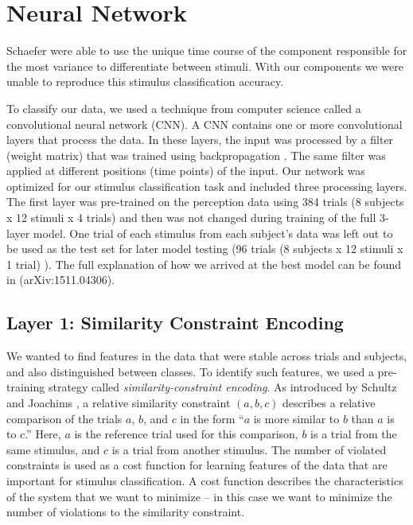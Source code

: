 \chapter{Neural Network}
Schaefer \etal \citeyear{schaefer_name_2011} were able to use the unique time course of the component responsible for the most variance to differentiate between stimuli.
With our components we were unable to reproduce this stimulus classification accuracy. 
 
To classify our data, we used a technique from computer science called a convolutional neural network (\ac{CNN}).
A \ac{CNN} contains one or more convolutional layers that process the data. 
In these layers, the input was processed by a filter (weight matrix) that was trained using backpropagation \cite{Rumelhart_backpropagation_1986}. 
The same filter was applied at different positions (time points) of the input. 
Our network was optimized for our stimulus classification task and included three processing layers.
The first layer was pre-trained on the perception data using 384 trials (8 subjects x 12 stimuli x 4 trials) and then was not changed during training of the full 3-layer model. 
One trial of each stimulus from each subject's data was left out to be used as the test set for later model testing (96 trials (8 subjects x 12 stimuli x 1 trial) ).
The full explanation of how we arrived at the best model can be found in \cite{stober_ICLR2016} (arXiv:1511.04306).

\section{Layer 1: Similarity Constraint Encoding}
We wanted to find features in the data that were stable across trials and subjects, and also distinguished between classes. 
To identify such features, we used a pre-training strategy called \emph{similarity-constraint encoding}.
As introduced by Schultz and Joachims \citeyear{schultz_learning_2004}, a relative similarity constraint $(a,b,c)$ describes a relative comparison of the trials $a$, $b$, and $c$ in the form ``$a$ is more similar to $b$ than $a$ is to $c$.''
Here, $a$ is the reference trial used for this comparison, $b$ is a trial from the same stimulus, and $c$ is a trial from another stimulus.
The number of violated constraints is used as a cost function for learning features of the data that are important for stimulus classification. 
A cost function describes the characteristics of the system that we want to minimize -- in this case we want to minimize the number of violations to the similarity constraint.

